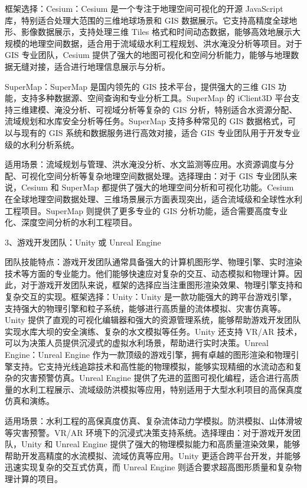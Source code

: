 框架选择：Cesium：Cesium 是一个专注于地理空间可视化的开源 JavaScript 库，特别适合处理大范围的三维地球场景和 GIS 数据展示。它支持高精度全球地形、影像数据展示，支持处理三维 Tiles 格式和时间动态数据，能够高效地展示大规模的地理空间数据，适合用于流域级水利工程规划、洪水淹没分析等项目。对于 GIS 专业团队，Cesium 提供了强大的地图可视化和空间分析能力，能够与地理数据无缝对接，适合进行地理信息展示与分析。

SuperMap：SuperMap 是国内领先的 GIS 技术平台，提供强大的三维 GIS 功能，支持多种数据源、空间查询和专业分析工具。SuperMap 的 iClient3D 平台支持三维建模、淹没分析、可视域分析等复杂的 GIS 分析，特别适合水资源分配、流域规划和水库安全分析等任务。SuperMap 支持多种常见的 GIS 数据格式，可以与现有的 GIS 系统和数据服务进行高效对接，适合 GIS 专业团队用于开发专业级的水利分析系统。

适用场景：流域规划与管理、洪水淹没分析、水文监测等应用。水资源调度与分配、可视化空间分析等复杂地理空间数据处理。选择理由：对于 GIS 专业团队来说，Cesium 和 SuperMap 都提供了强大的地理空间分析和可视化功能。Cesium 在全球地理空间数据处理、三维场景展示方面表现突出，适合流域级和全球性水利工程项目。SuperMap 则提供了更多专业的 GIS 分析功能，适合需要高度专业化、深度空间分析的水利工程项目。

3、游戏开发团队：Unity 或 Unreal Engine

团队技能特点：游戏开发团队通常具备强大的计算机图形学、物理引擎、实时渲染技术等方面的专业能力。他们能够快速应对复杂的交互、动态模拟和物理计算。因此，对于游戏开发团队来说，框架的选择应当注重图形渲染效果、物理引擎支持和复杂交互的实现。框架选择：Unity：Unity 是一款功能强大的跨平台游戏引擎，支持强大的物理引擎和粒子系统，能够进行高质量的流体模拟、灾害仿真等。Unity 提供了直观的可视化编辑器和强大的资源管理系统，能够帮助游戏开发团队实现水库大坝的安全演练、复杂的水文模拟等任务。Unity 还支持 VR/AR 技术，可以为决策人员提供沉浸式的虚拟水利场景，帮助进行实时决策。Unreal Engine：Unreal Engine 作为一款顶级的游戏引擎，拥有卓越的图形渲染和物理引擎支持。它支持光线追踪技术和高性能的物理模拟，能够实现精细的水流动态和复杂的灾害预警仿真。Unreal Engine 提供了先进的蓝图可视化编程，适合进行高质量的水利工程展示、流域级防洪模拟等应用，特别适用于大型水利项目的高保真度仿真和演练。

适用场景：水利工程的高保真度仿真、复杂流体动力学模拟。防洪模拟、山体滑坡等灾害预警。VR/AR 环境下的沉浸式决策支持系统。选择理由：对于游戏开发团队，Unity 和 Unreal Engine 提供了强大的物理模拟能力和高质量渲染效果，能够帮助开发高精度的水流模拟、流域仿真等应用。Unity 更适合跨平台开发，并能够迅速实现复杂的交互式仿真，而 Unreal Engine 则适合要求超高图形质量和复杂物理计算的项目。

